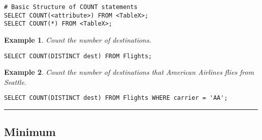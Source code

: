 \documentclass{article}
\newtheorem{example}{Example}
\begin{document}
\begin{lstlisting}[frame=single]
# Basic Structure of COUNT statements  
SELECT COUNT(<attribute>) FROM <TableX>;
SELECT COUNT(*) FROM <TableX>;
\end{lstlisting} 
  

\begin{example}
Count the number of destinations.
\end{example}

\begin{lstlisting}[frame=single]  
SELECT COUNT(DISTINCT dest) FROM Flights;
\end{lstlisting} 




\begin{example}
Count the number of destinations that American Airlines flies from Seattle.
\end{example}

\begin{lstlisting}[frame=single]  
SELECT COUNT(DISTINCT dest) FROM Flights WHERE carrier = 'AA';
\end{lstlisting} 


\hspace{-0.5cm}\rule[-0.101in]{\textwidth}{0.0025in}
  
  







  

\subsection*{Minimum}
\end{document}
